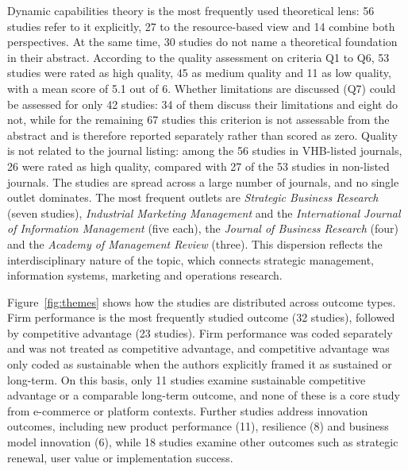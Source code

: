 Dynamic capabilities theory is the most frequently used theoretical lens: 56 studies refer to it explicitly, 27 to the resource-based view and 14 combine both perspectives. At the same time, 30 studies do not name a theoretical foundation in their abstract. According to the quality assessment on criteria Q1 to Q6, 53 studies were rated as high quality, 45 as medium quality and 11 as low quality, with a mean score of 5.1 out of 6. Whether limitations are discussed (Q7) could be assessed for only 42 studies: 34 of them discuss their limitations and eight do not, while for the remaining 67 studies this criterion is not assessable from the abstract and is therefore reported separately rather than scored as zero. Quality is not related to the journal listing: among the 56 studies in VHB-listed journals, 26 were rated as high quality, compared with 27 of the 53 studies in non-listed journals. The studies are spread across a large number of journals, and no single outlet dominates. The most frequent outlets are \emph{Strategic Business Research} (seven studies), \emph{Industrial Marketing Management} and the \emph{International Journal of Information Management} (five each), the \emph{Journal of Business Research} (four) and the \emph{Academy of Management Review} (three). This dispersion reflects the interdisciplinary nature of the topic, which connects strategic management, information systems, marketing and operations research.

Figure~\ref{fig:themes} shows how the studies are distributed across outcome types. Firm performance is the most frequently studied outcome (32 studies), followed by competitive advantage (23 studies). Firm performance was coded separately and was not treated as competitive advantage, and competitive advantage was only coded as sustainable when the authors explicitly framed it as sustained or long-term. On this basis, only 11 studies examine sustainable competitive advantage or a comparable long-term outcome, and none of these is a core study from e-commerce or platform contexts. Further studies address innovation outcomes, including new product performance (11), resilience (8) and business model innovation (6), while 18 studies examine other outcomes such as strategic renewal, user value or implementation success.

